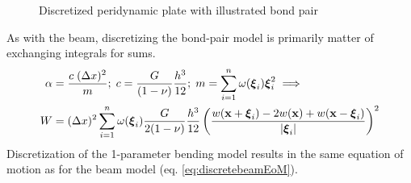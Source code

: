 %
\begin{figure}[h]
  \centering
{}
\caption{Discretized peridynamic plate with illustrated bond pair}
\label{fig:discretePlate}
\end{figure}
%
As with the beam, discretizing the bond-pair model is primarily matter of exchanging integrals for sums. 
%
%
\begin{align}
    \alpha &= \frac{c\; (\Delta x)^2}{m} ;\; c= \frac{G}{(1-\nu)}\frac{h^3}{12};\; m=\sum_{i=1}^n \omega(\boldsymbol{\xi}_i)\boldsymbol{\xi}_i^2 \implies \nonumber \\
    W&=(\Delta x)^2 \sum_{i=1}^n \omega(\boldsymbol{\xi}_i)\frac{G}{2(1-\nu)}\frac{h^3}{12}\left(\frac{w(\mathbf{x}+\boldsymbol{\xi}_i)-2w(\mathbf{x})+w(\mathbf{x}-\boldsymbol{\xi}_i)}{|\boldsymbol{\xi}_i|}\right)^2 \notag
\end{align}
%
Discretization of the 1-parameter bending model results in the same equation of motion as for the beam model (eq. \ref{eq:discretebeamEoM}).
%
%


